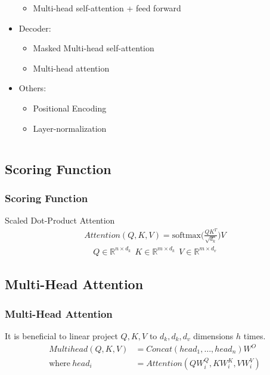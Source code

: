 \documentclass[]{beamer}
\newcommand{\bb}[1]{\mathbb{#1}}
\newcommand{\x}{\times}
\begin{document}
\begin{frame}
\begin{columns}
\begin{column}{0.5\textwidth}
\begin{itemize}
\begin{itemize}
                        \item Multi-head self-attention + feed forward
                    \end{itemize}
                \item Decoder: 
                    \begin{itemize}
                        \item Masked Multi-head self-attention
                        \item Multi-head attention
                    \end{itemize}
                \item Others:
                    \begin{itemize}
                        \item Positional Encoding
                        \item Layer-normalization
                    \end{itemize}
            \end{itemize}
                    
        \end{column}
        
    \end{columns}
\end{frame}

\subsection{Scoring Function}
\begin{frame}
    \frametitle{Scoring Function}
    Scaled Dot-Product Attention
    \begin{align*}
        Attention(Q, K, V) = \text{softmax} \Biggl(\frac{QK^T}{\sqrt{d_k}}\Biggr) V
    \end{align*}
    \begin{align*}
        Q \in \bb{R}^{n\x d_k}~~K \in \bb{R}^{m\x d_k}~~V\in \bb{R}^{m\x d_v}
    \end{align*}
\end{frame}

\subsection{Multi-Head Attention}
\begin{frame}
    \frametitle{Multi-Head Attention}
    It is beneficial to linear project $Q, K, V$ to $d_k, d_k, d_v$ dimensions $h$ times.
    \begin{align*}
        Multihead(Q,K,V) &= Concat(head_1, \ldots, head_n) W^O \\
        \text{where}~head_i &= Attention(QW_i^Q, KW_i^K, VW_i^V)
    \end{align*}
\end{frame}
\end{document}
